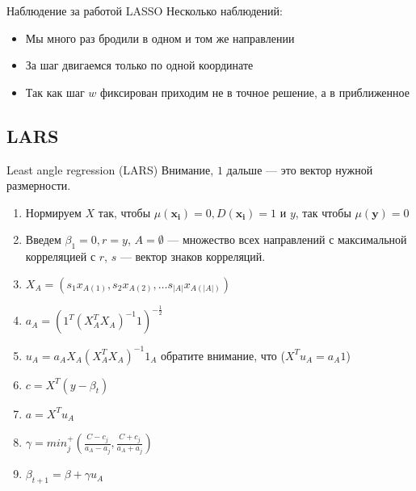 \documentclass[14pt, fleqn, xcolor={dvipsnames, table}]{beamer}
\begin{document}
\begin{frame}{Наблюдение за работой LASSO}
Несколько наблюдений:
\begin{itemize}
  \item Мы много раз бродили в одном и том же направлении
  \item За шаг двигаемся только по одной координате
  \item Так как шаг $w$ фиксирован приходим не в точное решение, а в приближенное
\end{itemize}
\end{frame}

\subsection{LARS}
\begin{frame}{Least angle regression (LARS)}
\small
Внимание, $1$ дальше --- это вектор нужной размерности.
\footnotesize
\begin{enumerate}
  \item Нормируем $X$ так, чтобы $\mu(\mathbf{x_i}) = 0, D(\mathbf{x_i}) = 1$ и $y$, так чтобы $\mu(\mathbf{y}) = 0$
  \item Введем $\beta_1 = 0, r = y$, $A = \emptyset$ --- множество всех направлений с максимальной корреляцией с $r$, $s$ --- вектор знаков корреляций.
  \item $X_A = \left(s_1x_{A(1)}, s_2x_{A(2)}, \ldots s_{|A|}x_{A(|A|)}\right)$
  \item $a_A = \left(1^T (X_A^TX_A)^{-1}1\right)^{-\frac{1}{2}}$
  \item $u_A = a_AX_A(X_A^TX_A)^{-1}1_A$ обратите внимание, что ($X^Tu_A = a_A 1$)
  \item $c = X^T (y - \beta_t)$
  \item $a = X^T u_A$
  \item $\gamma = min^+_j \left(\frac{C - c_j}{a_A - a_j}, \frac{C + c_j}{a_A + a_j}\right)$
  \item $\beta_{t+1} = \beta + \gamma u_A$
\end{enumerate}
\end{frame}
\end{document}
